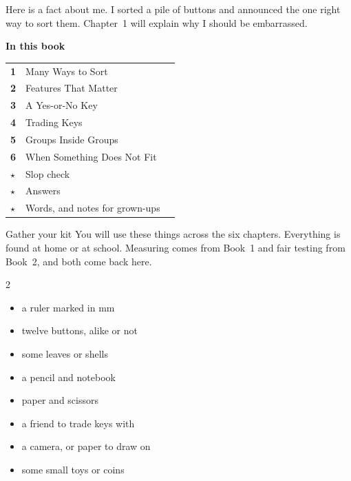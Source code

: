 \begin{multix}[hmm]\multixbot[hmm]\tcblower
Here is a fact about me. I sorted a pile of buttons and announced the one right way to sort them. Chapter~1 will explain why I should be embarrassed.
\end{multix}
\clearpage

\thispagestyle{plain}
{\sans\bfseries\LARGE\color{ink} In this book}\par\vspace{0.2cm}
{\sans\large
\begin{tabular}{@{}p{0.9cm}p{7.6cm}r@{}}
\textcolor{tangerine}{\bfseries 1} & Many Ways to Sort & \pageref{ch1}\\[3pt]
\textcolor{tangerine}{\bfseries 2} & Features That Matter & \pageref{ch2}\\[3pt]
\textcolor{tangerine}{\bfseries 3} & A Yes-or-No Key & \pageref{ch3}\\[3pt]
\textcolor{tangerine}{\bfseries 4} & Trading Keys & \pageref{ch4}\\[3pt]
\textcolor{tangerine}{\bfseries 5} & Groups Inside Groups & \pageref{ch5}\\[3pt]
\textcolor{tangerine}{\bfseries 6} & When Something Does Not Fit & \pageref{ch6}\\[3pt]
\textcolor{sky}{\bfseries $\star$} & Slop check & \pageref{slop}\\[3pt]
\textcolor{sky}{\bfseries $\star$} & Answers & \pageref{answers}\\[3pt]
\textcolor{sky}{\bfseries $\star$} & Words, and notes for grown-ups & \pageref{notes}\\
\end{tabular}}

\begin{tryit}{Gather your kit}
You will use these things across the six chapters. Everything is found at home or at school. Measuring comes from Book~1 and fair testing from Book~2, and both come back here.
\begin{multicols}{2}
\begin{itemize}[leftmargin=1.2em]
\item a ruler marked in mm
\item twelve buttons, alike or not
\item some leaves or shells
\item a pencil and notebook
\item paper and scissors
\item a friend to trade keys with
\item a camera, or paper to draw on
\item some small toys or coins
\end{itemize}
\end{multicols}
\end{tryit}


